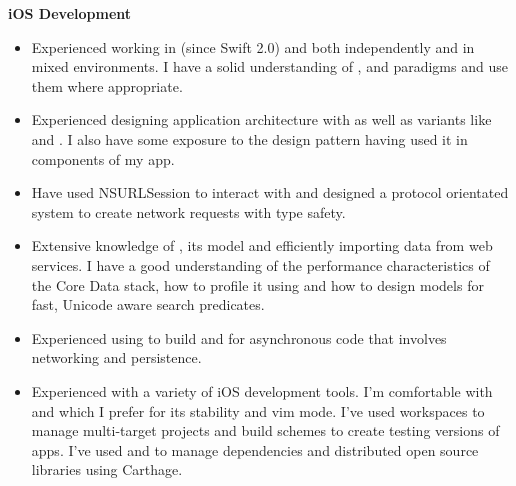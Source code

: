 \textbf{iOS Development}
\begin{itemize}[leftmargin=0mm]
\item Experienced working in  (since Swift 2.0) and
   both independently and in mixed environments. I have a
  solid understanding of , 
  and  paradigms and use them where appropriate.
\item Experienced designing application architecture with  as well as
  variants like  and . I also have some exposure to
  the  design pattern having used it in components of my app.
\item Have used NSURLSession to interact with  and
  designed a protocol orientated system to create network requests with type
  safety.
\item Extensive knowledge of , its  model
  and efficiently importing data from web services. I have a good understanding
  of the performance characteristics of the Core Data stack, how to profile it
  using  and how to design models for fast, Unicode aware
  search predicates.
\item Experienced using  to build  and
   for asynchronous code that involves networking and
  persistence.
\item Experienced with a variety of iOS development tools. I'm comfortable with
   and  which I prefer for its stability and vim
  mode. I've used workspaces to manage multi-target projects and build schemes
  to create testing versions of apps. I've used  and
   to manage dependencies and distributed open source libraries
  using Carthage.
\end{itemize}

